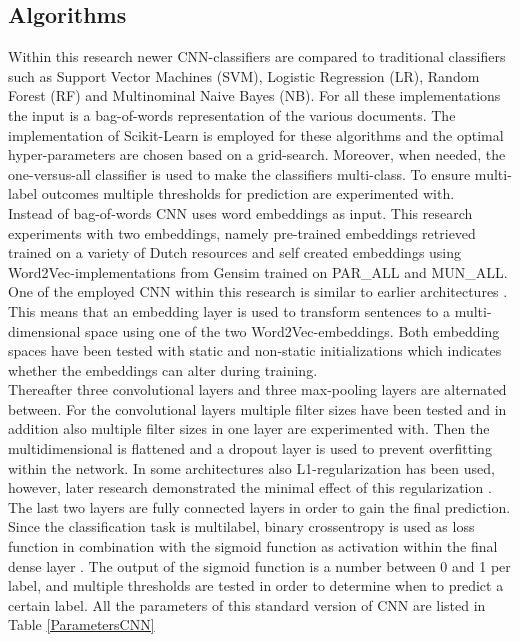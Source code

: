 \subsection{Algorithms}
Within this research newer CNN-classifiers are compared to traditional classifiers such as Support Vector Machines (SVM), Logistic Regression (LR), Random Forest (RF) and Multinominal Naive Bayes (NB). For all these implementations the input is a bag-of-words representation of the various documents. The implementation of Scikit-Learn is employed for these algorithms and the optimal hyper-parameters are chosen based on a grid-search. Moreover, when needed, the one-versus-all classifier is used to make the classifiers multi-class. To ensure multi-label outcomes multiple thresholds for prediction are experimented with.  \\
Instead of bag-of-words CNN uses word embeddings as input.  This research experiments with two embeddings, namely pre-trained embeddings retrieved trained on a variety of Dutch resources \cite{tulkens2016evaluating} and self created embeddings using Word2Vec-implementations from Gensim trained on PAR\_ALL and MUN\_ALL. \\
One of the employed CNN within this research is similar to earlier architectures \cite{kim2014convolutional}. This means that an embedding layer is used to transform sentences to a multi-dimensional space using one of the two Word2Vec-embeddings. Both embedding spaces have been tested with static and non-static initializations which indicates whether the embeddings can alter during training.\\
Thereafter three convolutional layers and three max-pooling layers are alternated between. For the convolutional layers multiple filter sizes have been tested and in addition also multiple filter sizes in one layer are experimented with. Then the multidimensional is flattened and a dropout layer is used to prevent overfitting within the network. In some architectures also L1-regularization has been used, however, later research demonstrated the minimal effect of this regularization \cite{zhang2015sensitivity}. \\
The last two layers are fully connected layers in order to gain the final prediction. Since the classification task is multilabel, binary crossentropy is used as loss function in combination with the sigmoid function as activation within the final dense layer \cite{nam2014large} \cite{Multiclass}. The output of the sigmoid function is a number between 0 and 1 per label, and multiple thresholds are tested in order to determine when to predict a certain label. All the parameters of this standard version of CNN are listed in Table \ref{ParametersCNN}\\

